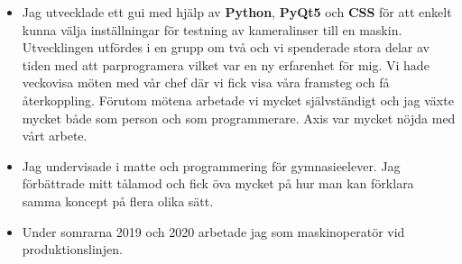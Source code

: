\documentclass[10pt,a4paper,ragged2e]{altacv}
\begin{document}
\divider

\begin{itemize}
  \item Jag utvecklade ett gui med hjälp av \textbf{Python}, \textbf{PyQt5} och \textbf{CSS} för att enkelt kunna
  välja inställningar för testning av kameralinser till en maskin. Utvecklingen utfördes i en grupp om två och vi spenderade
  stora delar av tiden med att parprogramera vilket var en ny erfarenhet för mig. Vi hade veckovisa möten med vår chef
  där vi fick visa våra framsteg och få återkoppling. Förutom mötena arbetade vi mycket självständigt och jag växte 
  mycket både som person och som programmerare. Axis var mycket nöjda med vårt arbete.
\end{itemize}

\divider

    \begin{itemize}
    \item Jag undervisade i matte och programmering för gymnasieelever. 
    Jag förbättrade mitt tålamod och fick öva mycket på hur man kan förklara 
    samma koncept på flera olika sätt.
\end{itemize}

\divider

\begin{itemize}
    \item Under somrarna 2019 och 2020 arbetade jag som maskinoperatör vid produktionslinjen.
\end{itemize}

\newpage
\end{document}
